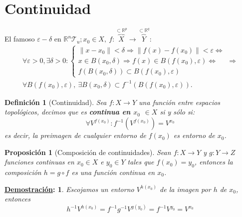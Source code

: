 \documentclass[10pt,a4paper,openright]{book}
\theoremstyle{break}
\newtheorem*{defi}{Definición}
\newtheorem*{prop}{Proposición}
\newtheorem*{demo}{\underline{Demostración}:}
\begin{document}
\section{Continuidad}%
\label{sec:continuidad}
El famoso $\varepsilon-\delta$ en $\mathbb{R}^n \mathcal{T}_u; x_0 \in X,\ f : \overbrace{X}^{\subset \mathbb{R}^p} \rightarrow \overbrace{Y}^{\subset \mathbb{R}^q}$: 
\begin{gather*}        
\forall \varepsilon > 0, \exists \delta > 0: 
\begin{cases}
    \lVert x - x_0 \rVert < \delta \Rightarrow \lVert f\left( x \right) - f\left( x_0 \right) \rVert < \varepsilon \Leftrightarrow\\
    x \in B\left( x_0, \delta \right) \Rightarrow f\left( x \right) \in B\left( f\left( x_0 \right), \varepsilon \right) \Leftrightarrow\\
    f\left( B\left( x_0, \delta \right) \right) \subset B\left( f\left( x_0 \right), \varepsilon \right) 
\end{cases} \Rightarrow\\
\boxed{\forall B\left( f\left( x_0 \right), \varepsilon \right),\ \exists B\left( x_0, \delta \right) \subset f^{-1}\left( B\left( f\left( x_0 \right), \varepsilon \right) \right)} 
.\end{gather*}

\begin{defi}[Continuidad]
Sea $f: X \rightarrow Y$ una función entre espacios topológicos, decimos que es \textbf{continua en $x_0$ $\in X$} si y sólo si:
\[
\forall V^{f\left( x_0 \right)} :  f^{-1}\left( V^{f\left( x_0 \right)} \right) = V^{x_0} 
\]
es decir, la preimagen de cualquier entorno de $f(x_0)$ es entorno de $x_0$.
\end{defi}

\begin{prop}[Composición de continuidades]
Sean $f:X \rightarrow Y$ y $g: Y \rightarrow Z$ funciones continuas en $x_0\in X$ e $y_0\in Y$ tales que $f(x_0) = y_0$, entonces la composición $h = g \circ f$ es una función continua en $x_0$.
\end{prop}
\begin{demo}
Escojamos un entorno $V^{h\left( x_0 \right)}$ de la imagen por $h$ de $x_0$, entonces
\[
h^{-1} V^{h\left( x_0 \right)} = f^{-1}g^{-1}V^{g\left( y_0 \right)} = f^{-1} V^{y_0} = V^{x_0}
\]
\end{demo}
\end{document}
